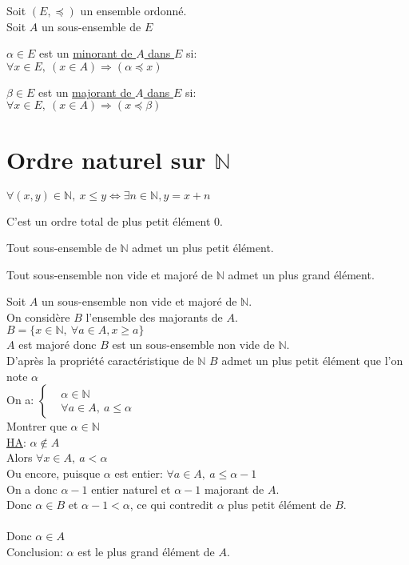 \documentclass[12pt,twoside,a4paper]{article}
\begin{document}
		\begin{defi}
			Soit $(E,\preccurlyeq)$ un ensemble ordonn\'e.\\
			Soit $A$ un sous-ensemble de $E$
			\begin{liste}
				\item $\alpha\in E$ est un \underline{minorant de $A$ dans $E$} si:\\
					$\forall x\in E,\ (x\in A)\Rightarrow(\alpha\preccurlyeq x)$
				\item $\beta\in E$ est un \underline{majorant de $A$ dans $E$} si:\\
					$\forall x\in E,\ (x\in A)\Rightarrow(x\preccurlyeq\beta)$
			\end{liste}
		\end{defi}
	\section{Ordre naturel sur $\mathbb{N}$}
		\begin{defi}
			$\forall(x,y)\in \mathbb{N},\ x\leqslant y\iff\exists n\in\mathbb{N}, y=x+n$
		\end{defi}
		C'est un ordre total de plus petit \'el\'ement $0$.
		\begin{prop}
			Tout sous-ensemble de $\mathbb{N}$ admet un plus petit \'el\'ement.
		\end{prop}
		\begin{coro}
			Tout sous-ensemble non vide et major\'e de $\mathbb{N}$ admet un plus grand \'el\'ement.
		\end{coro}
		\begin{preuve}
			Soit $A$ un sous-ensemble non vide et major\'e de $\mathbb{N}$.\\
			On consid\`ere $B$ l'ensemble des majorants de $A$.\\
			$B=\{x\in\mathbb{N},\ \forall a\in A, x\geqslant a\}$\\
			$A$ est major\'e donc $B$ est un sous-ensemble non vide de $\mathbb{N}$.\\
			D'apr\`es la propri\'et\'e caract\'eristique de $\mathbb{N}$ $B$ admet un plus petit \'el\'ement que l'on note $\alpha$\\
			On a: $\left\lbrace\begin{aligned}&\alpha\in\mathbb{N}\\&\forall a\in A,\ a\leqslant\alpha\end{aligned}\right.$\\
			Montrer que $\alpha\in\mathbb{N}$\\
			\underline{HA}: $\alpha \notin A$\\
			Alors $\forall x\in A,\ a<\alpha$\\
			Ou encore, puisque $\alpha$ est entier: $\forall a\in A,\ a\leqslant\alpha-1$\\
			On a donc $\alpha-1$ entier naturel et $\alpha-1$ majorant de $A$.\\
			Donc $\alpha\in B$ et $\alpha-1<\alpha$, ce qui contredit $\alpha$ plus petit élément de $B$.\\
			\\
			Donc $\alpha\in A$\\
			Conclusion: $\alpha$ est le plus grand élément de $A$.
		\end{preuve}
\end{document}
